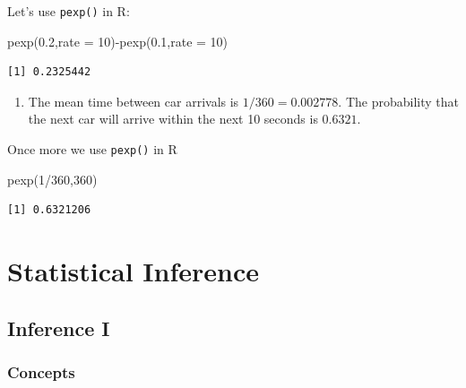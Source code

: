 \documentclass[
  letterpaper,
  DIV=11,
  numbers=noendperiod]{scrreprt}
\newenvironment{Shaded}{\begin{snugshade}}{\end{snugshade}}
\newcommand{\AttributeTok}[1]{\textcolor[rgb]{0.40,0.45,0.13}{#1}}
\newcommand{\DecValTok}[1]{\textcolor[rgb]{0.68,0.00,0.00}{#1}}
\newcommand{\FloatTok}[1]{\textcolor[rgb]{0.68,0.00,0.00}{#1}}
\newcommand{\FunctionTok}[1]{\textcolor[rgb]{0.28,0.35,0.67}{#1}}
\newcommand{\NormalTok}[1]{\textcolor[rgb]{0.00,0.23,0.31}{#1}}
\newcommand{\SpecialCharTok}[1]{\textcolor[rgb]{0.37,0.37,0.37}{#1}}
\providecommand{\tightlist}{%
  \setlength{\itemsep}{0pt}\setlength{\parskip}{0pt}}\usepackage{longtable,booktabs,array}
\begin{document}
Let's use \texttt{pexp()} in R:

\begin{Shaded}
\begin{Highlighting}[numbers=left,,]
\FunctionTok{pexp}\NormalTok{(}\FloatTok{0.2}\NormalTok{,}\AttributeTok{rate =} \DecValTok{10}\NormalTok{)}\SpecialCharTok{{-}}\FunctionTok{pexp}\NormalTok{(}\FloatTok{0.1}\NormalTok{,}\AttributeTok{rate =} \DecValTok{10}\NormalTok{)}
\end{Highlighting}
\end{Shaded}

\begin{verbatim}
[1] 0.2325442
\end{verbatim}

\begin{blackbox}

\begin{enumerate}
\def\labelenumi{\arabic{enumi}.}
\setcounter{enumi}{1}
\tightlist
\item
  The mean time between car arrivals is \(1/360=0.002778\). The
  probability that the next car will arrive within the next 10 seconds
  is \(0.6321\).
\end{enumerate}

\end{blackbox}

Once more we use \texttt{pexp()} in R

\begin{Shaded}
\begin{Highlighting}[numbers=left,,]
\FunctionTok{pexp}\NormalTok{(}\DecValTok{1}\SpecialCharTok{/}\DecValTok{360}\NormalTok{,}\DecValTok{360}\NormalTok{)}
\end{Highlighting}
\end{Shaded}

\begin{verbatim}
[1] 0.6321206
\end{verbatim}

\part{Statistical Inference}

\hypertarget{inference-i}{%
\chapter{Inference I}\label{inference-i}}

\hypertarget{concepts-10}{%
\section{Concepts}\label{concepts-10}}
\end{document}
